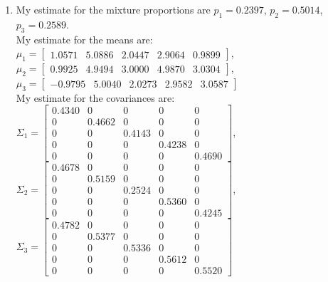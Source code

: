 \documentclass[a4paper]{article}
\begin{document}
\begin{spacing}{2.0}
\begin{enumerate}[(1)]
\item My estimate for the mixture proportions are $p_1 = 0.2397$, $p_2 = 0.5014$, $p_3 = 0.2589$.\\
My estimate for the means are:\\
 $\mu_1 = \begin{bmatrix} 1.0571 & 5.0886 & 2.0447 & 2.9064 & 0.9899\end{bmatrix}$, \\
 $\mu_2 = \begin{bmatrix} 0.9925 & 4.9494 & 3.0000 & 4.9870 & 3.0304\end{bmatrix}$, \\
 $\mu_3 = \begin{bmatrix} -0.9795 & 5.0040 & 2.0273 & 2.9582 & 3.0587\end{bmatrix}$ \\
 My estimate for the covariances are:\\
 $\Sigma_1 = \begin{bmatrix} 0.4340 & 0 & 0 & 0 & 0\\0 & 0.4662 & 0 & 0 & 0\\0 & 0 & 0.4143 & 0 & 0\\0 & 0 & 0 & 0.4238 & 0\\0 & 0 & 0 & 0 & 0.4690\end{bmatrix}$, \\
  $\Sigma_2 = \begin{bmatrix} 0.4678 & 0 & 0 & 0 & 0\\0 & 0.5159 & 0 & 0 & 0\\0 & 0 & 0.2524 & 0 & 0\\0 & 0 & 0 & 0.5360 & 0\\0 & 0 & 0 & 0 & 0.4245\end{bmatrix}$, \\
   $\Sigma_3 = \begin{bmatrix} 0.4782 & 0 & 0 & 0 & 0\\0 & 0.5377 & 0 & 0 & 0\\0 & 0 & 0.5336 & 0 & 0\\0 & 0 & 0 & 0.5612 & 0\\0 & 0 & 0 & 0 & 0.5520\end{bmatrix}$
\end{enumerate}

\newpage

\end{spacing}
\end{document}
